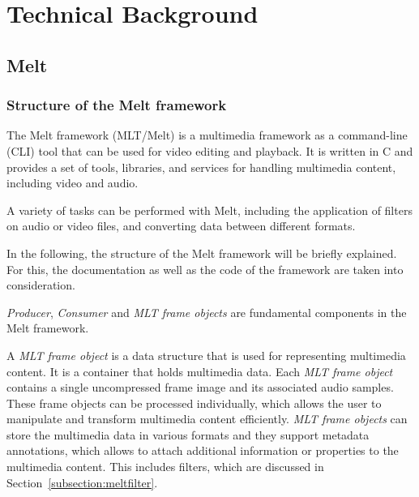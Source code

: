\documentclass[../MasterThesis.tex]{subfiles}
\begin{document}
	
	

\newpage

\section{Technical Background} \label{subsection:technicalbackground}




\subsection{Melt} \label{subsection:melt}
\subsubsection*{Structure of the Melt framework}

The Melt framework (MLT/Melt) is a multimedia framework as a command-line (CLI) tool that can be used for video editing and playback. It is written in C and provides a set of tools, libraries, and services for handling multimedia content, including video and audio.~\cite{melt} 


A variety of tasks can be performed with Melt, including the application of filters on audio or video files, and converting data between different formats. 

In the following, the structure of the Melt framework will be briefly explained. For this, the documentation as well as the code of the framework are taken into consideration.~\cite{melt, melt_code}

\textit{Producer}, \textit{Consumer} and \textit{MLT frame objects} are fundamental components in the Melt framework.

A \textit{MLT frame object} is a data structure that is used for representing multimedia content. 
It is a container that holds multimedia data. Each \textit{MLT frame object} contains a single uncompressed frame image and its associated audio samples. These frame objects can be processed individually, which allows the user to manipulate and transform multimedia content efficiently.
\textit{MLT frame objects} can store the multimedia data in various formats and they support metadata annotations, which allows to attach additional information or properties to the multimedia content. This includes filters, which are discussed in Section~\ref{subsection:meltfilter}.
\end{document}
